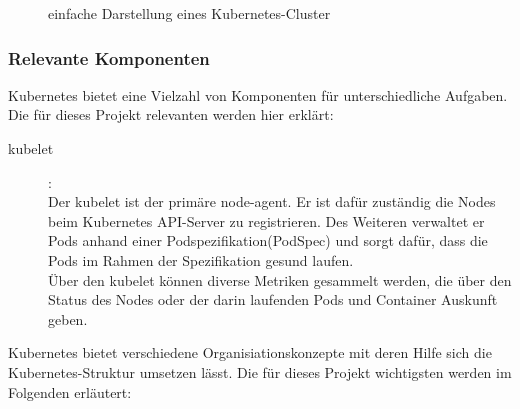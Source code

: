 \documentclass[a4paper,10pt]{scrartcl}
\begin{document}
\cite{components} \cite{node} \cite{concepts}


\begin{figure}[htbp]
\hspace{-2.5cm}
  
  \caption{einfache Darstellung eines Kubernetes-Cluster}
\end{figure}

\pagebreak

\subsubsection{Relevante Komponenten}

Kubernetes bietet eine Vielzahl von Komponenten für unterschiedliche Aufgaben. Die für dieses Projekt relevanten werden hier erklärt:

\begin{description}

\item[kubelet]:\\
Der kubelet ist der primäre \glqq node-agent\grqq. Er ist dafür zuständig die Nodes beim Kubernetes API-Server zu registrieren. Des Weiteren verwaltet er Pods anhand einer Podspezifikation(PodSpec) und sorgt dafür, dass die Pods im Rahmen der Spezifikation \glqq gesund\grqq{} laufen.\\
Über den kubelet können diverse Metriken gesammelt werden, die über den Status des Nodes oder der darin laufenden Pods und Container Auskunft geben. \cite{kubelet} \\

\end{description}

Kubernetes bietet verschiedene Organisiationskonzepte mit deren Hilfe sich die Kubernetes-Struktur umsetzen lässt. Die für dieses Projekt wichtigsten werden im Folgenden erläutert:
\end{document}
